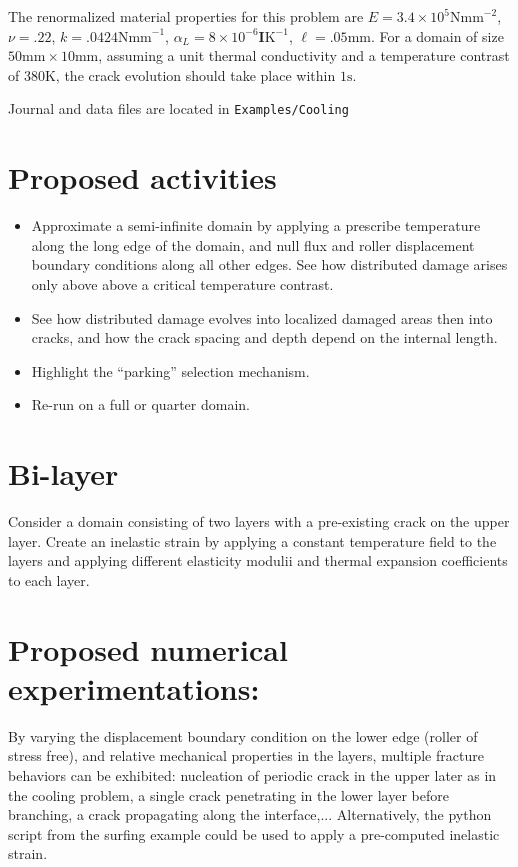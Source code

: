 \documentclass[10pt,oneside]{memoir}
\begin{document}
The renormalized material properties for this problem are $E = 3.4\times 10^5 \mathrm{Nmm}^{-2}$, $\nu = .22$, $k = .0424 \mathrm{Nmm}^{-1}$, $\alpha_L = 8\times10^{-6} \mathbf{I}\mathrm{K}^{-1}$, $\ell = .05\mathrm{mm}$. For a domain of size $50 \mathrm{mm} \times 10 \mathrm{mm}$, assuming a unit thermal conductivity and a temperature contrast of $380\mathrm{K}$, the crack evolution should take place within $1\mathrm{s}$.


Journal and data files are located in  \verb+Examples/Cooling+

\section*{Proposed activities}
\begin{itemize}
\item Approximate a semi-infinite domain by applying a prescribe temperature along the long edge of the domain, and null flux and roller displacement boundary conditions along all other edges. See how distributed damage arises only above above a critical temperature contrast.
\item See how distributed damage evolves into localized damaged areas then into cracks, and how the crack spacing and depth depend on the internal length.
\item Highlight the ``parking'' selection mechanism.
\item Re-run on a full or quarter domain.
\end{itemize}

\section{Bi-layer}
Consider a domain consisting of two layers with a pre-existing crack on the upper layer. Create an inelastic strain by applying a constant temperature field to the layers and applying different elasticity modulii and thermal expansion coefficients to each layer.

\section*{Proposed numerical experimentations:}
By varying the displacement boundary condition on the lower edge (roller of stress free), and relative mechanical properties in the layers, multiple fracture behaviors can be exhibited: nucleation of periodic crack in the upper later as in the cooling problem, a single crack penetrating in the lower layer before branching, a crack propagating along the interface,...
Alternatively, the python script from the surfing example could be used to apply a pre-computed inelastic strain.



\end{document}
